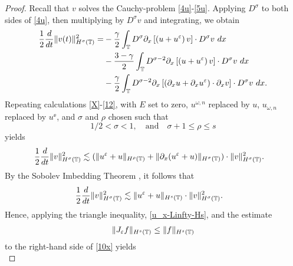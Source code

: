 %
%
%
\begin{proof}
Recall that $v$ solves the Cauchy-problem \eqref{4u}-\eqref{5u}.
Applying $D^\sigma$ to both sides of \eqref{4u}, then multiplying by
$D^\sigma v$ and integrating, we obtain 
%
%
\begin{equation*}
\begin{split}
\frac{1}{2}\frac{d}{dt}\|v(t)\|_{H^\sigma(\mathbb{T})}^2
= & - \frac{\gamma}{2}\int_{\mathbb{T}} D^\sigma
\partial_x \left[ \left( u + u^\varepsilon \right)v
\right]\cdot D^\sigma v \ dx
\\
& - \frac{3-\gamma}{2}\int_{\mathbb{T}} D^{\sigma
-2} \partial_x \left[ \left( u + u^\varepsilon
\right)v \right] \cdot D^\sigma v \ dx
\\
& - \frac{\gamma}{2}\int_{\mathbb{T}} D^{\sigma
-2}
\partial_x \left[ \left( \partial_x u + \partial_x u^\varepsilon
\right)\cdot \partial_x v \right] \cdot
D^\sigma v \ dx.
\end{split}
\end{equation*}
%
%
Repeating calculations \eqref{X}-\eqref{12}, with $E$ set to zero,
$u^{\omega,n}$ replaced by $u$, $u_{\omega,n}$ replaced by $u^\ee$, and
$\sigma$ and $\rho$ chosen such that
%
%
%
\begin{equation*}
\label{size_of_sigma}
 1/2 < \sigma < 1,
 \quad 
 \text{and}
 \quad
 \sigma + 1 \le \rho \le s 
\end{equation*}
%
%
yields
%
%
\begin{equation*}
\begin{split}
\frac{1}{2}\frac{d}{dt} \|v\|_{H^\sigma(\mathbb{T})}^2
& \lesssim
(\|u^{\varepsilon} + u\|_{H^{\rho}(\mathbb{T})} +
\|\partial_x(u^{\varepsilon} + u) \|_{H^\sigma(\mathbb{T})})
\cdot \|v\|_{H^\sigma(\mathbb{T})}^2.
\end{split}
\end{equation*}
%
%
By the Sobolev Imbedding Theorem , it follows that 
%
%
\begin{equation}
\begin{split}
\frac{1}{2}\frac{d}{dt} \|v\|_{H^{\sigma}(\mathbb{T})}^2
& \lesssim
\|u^{\varepsilon}
+ u\|_{H^{s}(\mathbb{T})} \cdot \|v\|_{H^{\sigma}(\mathbb{T})}^2.
\label{10x}
\end{split}
\end{equation}
%
%
Hence, applying the triangle inequality, \eqref{u_x-Linfty-Hs}, and the estimate
%
%
\begin{equation}
\begin{split}
	\|J_\varepsilon f\|_{H^s(\mathbb{T})} \le \|f\|_{H^s(\mathbb{T})}
\label{lem100u}
\end{split}
\end{equation}
%
%
%
%
to the right-hand side of \eqref{10x} yields
%
%
%
%
%
\begin{equation*}

\end{equation*}
\end{proof}
